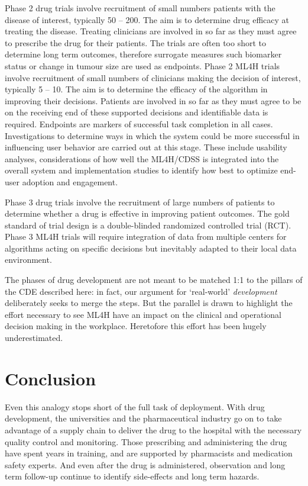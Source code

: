 Phase 2 drug trials involve recruitment of small numbers patients with
the disease of interest, typically 50 -- 200. The aim is to determine
drug efficacy at treating the disease. Treating clinicians are involved
in so far as they must agree to prescribe the drug for their patients.
The trials are often too short to determine long term outcomes,
therefore surrogate measures such biomarker status or change in tumour
size are used as endpoints.\citep{vannorman2019} Phase 2 ML4H trials
involve recruitment of small numbers of clinicians making the decision
of interest, typically 5 -- 10. The aim is to determine the efficacy of
the algorithm in improving their decisions. Patients are involved in so
far as they must agree to be on the receiving end of these supported
decisions and identifiable data is required. Endpoints are markers of
successful task completion in all cases. Investigations to determine
ways in which the system could be more successful in influencing user
behavior are carried out at this stage. These include usability
analyses, considerations of how well the ML4H/CDSS is integrated into
the overall system and implementation studies to identify how best to
optimize end-user adoption and engagement.\citep{sutton2020}

Phase 3 drug trials involve the recruitment of large numbers of patients
to determine whether a drug is effective in improving patient outcomes.
The gold standard of trial design is a double-blinded randomized
controlled trial (RCT). Phase 3 ML4H trials will require integration of
data from multiple centers for algorithms acting on specific decisions
but inevitably adapted to their local data environment.

The phases of drug development are not meant to be matched 1:1 to the
pillars of the CDE described here: in fact, our argument for
`real-world' \emph{development} deliberately seeks to merge the steps.
But the parallel is drawn to highlight the effort necessary to see ML4H
have an impact on the clinical and operational decision making in the
workplace. Heretofore this effort has been hugely underestimated.

\hypertarget{conclusion}{%
\section{Conclusion}\label{conclusion}}

Even this analogy stops short of the full task of deployment. With drug
development, the universities and the pharmaceutical industry go on to
take advantage of a supply chain to deliver the drug to the hospital
with the necessary quality control and monitoring. Those prescribing and
administering the drug have spent years in training, and are supported
by pharmacists and medication safety experts. And even after the drug is
administered, observation and long term follow-up continue to identify
side-effects and long term hazards.

